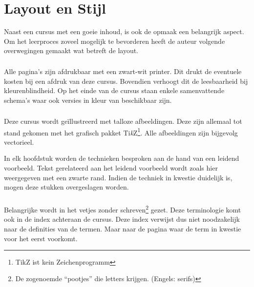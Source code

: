 \chapter*{Layout en Stijl}
Naast een cursus met een goeie inhoud, is ook de opmaak een belangrijk aspect. Om het leerproces zoveel mogelijk te bevorderen heeft de auteur volgende overwegingen gemaakt wat betreft de layout.
\paragraph{}
Alle pagina's zijn afdrukbaar met een zwart-wit printer. Dit drukt de eventuele kosten bij een afdruk van deze cursus. Bovendien verhoogt dit de leesbaarheid bij kleurenblindheid. Op het einde van de cursus staan enkele samenvattende schema's waar ook versies in kleur van beschikbaar zijn.
\paragraph{}
Deze cursus wordt ge\"illustreerd met talloze afbeeldingen. Deze zijn allemaal tot stand gekomen met het grafisch pakket Ti\textit{k}Z\footnote{TikZ ist kein Zeichenprogramm}. Alle afbeeldingen zijn bijgevolg vectorieel.
\begin{leftbar}
In elk hoofdstuk worden de technieken besproken aan de hand van een leidend voorbeeld. Tekst gerelateerd aan het leidend voorbeeld wordt zoals hier weergegeven met een zwarte rand. Indien de techniek in kwestie duidelijk is, mogen deze stukken overgeslagen worden.
\end{leftbar}
\paragraph{}
Belangrijke  wordt in het vetjes zonder schreven\footnote{De zogenoemde ``pootjes'' die letters krijgen. (Engels: serifs)} gezet. Deze terminologie komt ook in de index achteraan de cursus. Deze index verwijst dus niet noodzakelijk naar de definities van de termen. Maar naar de pagina waar de term in kwestie voor het eerst voorkomt.
